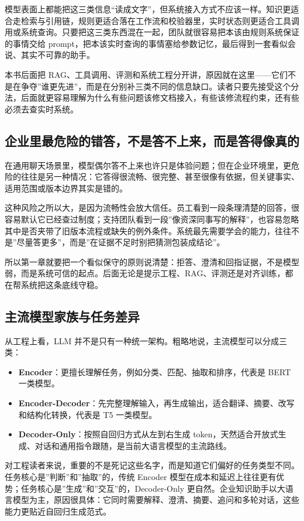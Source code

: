 模型表面上都能把这三类信息“读成文字”，但系统接入方式不应该一样。知识更适合走检索与引用链，规则更适合落在工作流和校验器里，实时状态则更适合工具调用或系统查询。只要把这三类东西混在一起，团队就很容易把本该由规则系统保证的事情交给 prompt，把本该实时查询的事情塞给参数记忆，最后得到一套看似会说、其实不可靠的助手。

本书后面把 RAG、工具调用、评测和系统工程分开讲，原因就在这里——它们不是在争夺”谁更先进”，而是在分别补三类不同的信息缺口。读者只要先接受这个分法，后面就更容易理解为什么有些问题该修文档接入，有些该修流程约束，还有些必须去查实时系统。

\subsection{企业里最危险的错答，不是答不上来，而是答得像真的}
在通用聊天场景里，模型偶尔答不上来也许只是体验问题；但在企业环境里，更危险的往往是另一种情况：它答得很流畅、很完整、甚至很像有依据，但关键事实、适用范围或版本边界其实是错的。

这种风险之所以大，是因为流畅性会放大信任。员工看到一段条理清楚的回答，很容易默认它已经查过制度；支持团队看到一段”像资深同事写的解释”，也容易忽略其中是否夹带了旧版本流程或缺失的例外条件。系统最先需要学会的能力，往往不是”尽量答更多”，而是”在证据不足时别把猜测包装成结论”。

所以第一章就要把一个看似保守的原则说清楚：拒答、澄清和回指证据，不是模型弱，而是系统可信的起点。后面无论是提示工程、RAG、评测还是对齐训练，都在帮系统把这条底线守稳。

\subsection{主流模型家族与任务差异}
从工程上看，LLM 并不是只有一种统一架构。粗略地说，主流模型可以分成三类：
\begin{itemize}
  \item \textbf{Encoder}：更擅长理解任务，例如分类、匹配、抽取和排序，代表是 BERT 一类模型。
  \item \textbf{Encoder-Decoder}：先完整理解输入，再生成输出，适合翻译、摘要、改写和结构化转换，代表是 T5 一类模型。
  \item \textbf{Decoder-Only}：按照自回归方式从左到右生成 token，天然适合开放式生成、对话和通用指令跟随，是当前大语言模型的主流路线。
\end{itemize}

对工程读者来说，重要的不是死记这些名字，而是知道它们偏好的任务类型不同。任务核心是”判断”和”抽取”的，传统 Encoder 模型在成本和延迟上往往更有优势；任务核心是”生成”和”交互”的，Decoder-Only 更自然。企业知识助手以大语言模型为主，原因很具体：它同时需要解释、澄清、摘要、追问和多轮对话，这些能力更贴近自回归生成范式。

